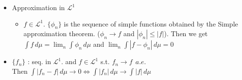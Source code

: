 \documentclass[12pt]{article}
\newcommand{\LL}{\mathcal{L}}
\begin{document}
\begin{itemize}
\begin{itemize}
\begin{enumerate}
        \end{enumerate}
    \end{itemize}
    \item Approximation in $\LL^1$
    \begin{itemize}
        \item $f\in \LL^1$. $\{\phi_n\}$ is the sequence of simple functions obtained by the Simple approximation theorem. ($\phi_n\rightarrow f$ and $|\phi_n|\leq |f|$).  Then we get \\ $\int f \, d\mu=\lim_n \int \phi_n \,d\mu$ \;and\; $\lim_n\int |f-\phi_n|\,d\mu=0$
    \end{itemize}
    \item $\{f_n\}$ : seq. in $\LL^1.$ and $f\in \LL^1$ s.t. $f_n\rightarrow f\;\, a.e.$ \\Then $\int |f_n-f|\,d\mu\rightarrow 0\Leftrightarrow \int |f_n|\, d\mu\rightarrow \int |f|\, d\mu$ 
\end{itemize}
\clearpage
\end{document}
